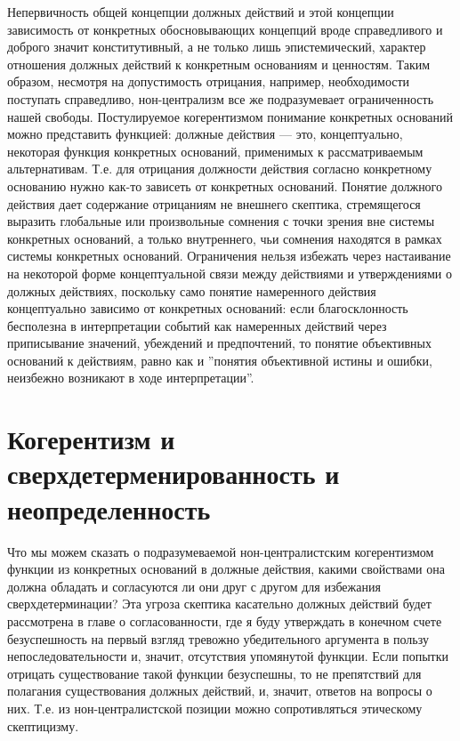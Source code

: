 \documentclass[11pt]{book}
\begin{document}
Непервичность общей концепции должных действий и этой концепции зависимость от конкретных обосновывающих концепций вроде справедливого и доброго значит конститутивный, а не только лишь эпистемический, характер отношения должных действий к конкретным основаниям и ценностям. Таким образом, несмотря на допустимость отрицания, например, необходимости поступать справедливо, нон-централизм все же подразумевает ограниченность нашей свободы. Постулируемое когерентизмом понимание конкретных оснований можно представить функцией: должные действия --- это, концептуально, некоторая функция конкретных оснований, применимых к рассматриваемым альтернативам. Т.е. для отрицания должности действия согласно конкретному основанию нужно как-то зависеть от конкретных оснований. Понятие должного действия дает содержание отрицаниям не внешнего скептика, стремящегося выразить глобальные или произвольные сомнения с точки зрения вне системы конкретных оснований, а только внутреннего, чьи сомнения находятся в рамках системы конкретных оснований. Ограничения нельзя избежать через настаивание на некоторой форме концептуальной связи между действиями и утверждениями о должных действиях, поскольку само понятие намеренного действия концептуально зависимо от конкретных оснований: если благосклонность бесполезна в интерпретации событий как намеренных действий через приписывание значений, убеждений и предпочтений, то понятие объективных оснований к действиям, равно как и ''понятия объективной истины и ошибки, неизбежно возникают в ходе интерпретации''.

\section{Когерентизм и сверхдетерменированность и неопределенность}

Что мы можем сказать о подразумеваемой нон-централистским когерентизмом функции из конкретных оснований в должные действия, какими свойствами она должна обладать и согласуются ли они друг с другом для избежания сверхдетерминации? Эта угроза скептика касательно должных действий будет рассмотрена в главе о согласованности, где я буду утверждать в конечном счете безуспешность на первый взгляд тревожно убедительного аргумента в пользу непоследовательности и, значит, отсутствия упомянутой функции. Если попытки отрицать существование такой функции безуспешны, то не препятствий для полагания существования должных действий, и, значит, ответов на вопросы о них. Т.е. из нон-централистской позиции можно сопротивляться этическому скептицизму.
\end{document}
